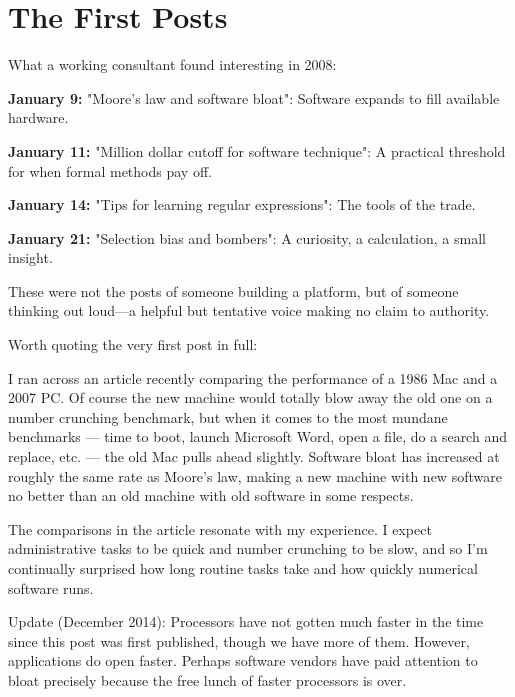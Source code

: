 \bigskip

\section*{The First Posts}

What a working consultant found interesting in 2008:

\textbf{January 9:} "Moore's law and software bloat": Software expands to fill available hardware.

\textbf{January 11:} "Million dollar cutoff for software technique": A practical threshold for when formal methods pay off.

\textbf{January 14:} "Tips for learning regular expressions": The tools of the trade.

\textbf{January 21:} "Selection bias and bombers": A curiosity, a calculation, a small insight.

These were not the posts of someone building a platform, but of someone thinking out loud---a helpful but tentative voice making no claim to authority.

Worth quoting the very first post in full:

\begin{blogquote}
I ran across an article recently comparing the performance of a 1986 Mac and a 2007 PC. Of course the new machine would totally blow away the old one on a number crunching benchmark, but when it comes to the most mundane benchmarks --- time to boot, launch Microsoft Word, open a file, do a search and replace, etc. --- the old Mac pulls ahead slightly. Software bloat has increased at roughly the same rate as Moore's law, making a new machine with new software no better than an old machine with old software in some respects.
\end{blogquote}

\begin{blogquote}
The comparisons in the article resonate with my experience. I expect administrative tasks to be quick and number crunching to be slow, and so I'm continually surprised how long routine tasks take and how quickly numerical software runs.
\end{blogquote}

\begin{blogquote}
Update (December 2014): Processors have not gotten much faster in the time since this post was first published, though we have more of them. However, applications do open faster. Perhaps software vendors have paid attention to bloat precisely because the free lunch of faster processors is over.
\end{blogquote}


